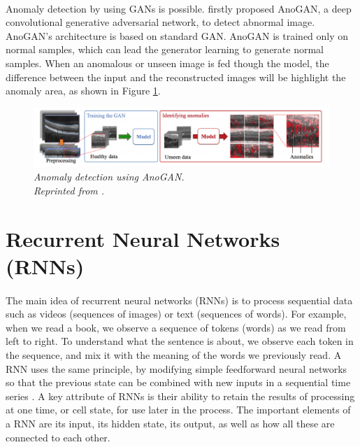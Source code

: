 \paragraph{}
Anomaly detection by using GANs is possible.  \citeyear{schlegl2017unsupervised} firstly proposed AnoGAN, a deep convolutional generative adversarial network, to detect abnormal image. AnoGAN's architecture is based on standard GAN. AnoGAN is trained only on normal samples, which can lead the generator learning to generate normal samples. When an anomalous or unseen image is fed though the model, the difference between the input and the reconstructed images will be highlight the anomaly area, as shown in Figure \ref{fig:GAN_anomaly}. 

\begin{figure}[H]
  \centering
  \caption[Anomaly detection using AnoGAN.]{\emph{Anomaly detection using AnoGAN. \\
  Reprinted from \citeauthor{schlegl2017unsupervised} \citeyear{schlegl2017unsupervised}.}}\label{fig:GAN_anomaly}
  \includegraphics[scale = 0.35]{figures/GAN_anomaly.jpg}  
\end{figure}



\section{Recurrent Neural Networks (RNNs)}
\paragraph{}
The main idea of recurrent neural networks (RNNs) is to process sequential data such as videos (sequences of images) or text (sequences of words). For example, when we read a book, we observe a sequence of tokens (words) as we read from left to right. To understand what the sentence is about, we observe each token in the sequence, and mix it with the meaning of the words we previously read. A RNN uses the same principle, by modifying simple feedforward neural networks so that the previous state can be combined with new inputs in a sequential time series \cite{donges_2019}. A key attribute of RNNs is their ability to retain the results of processing at one time, or cell state, for use later in the process. The important elements of a RNN are its input, its hidden state, its output, as well as how all these are connected to each other.


